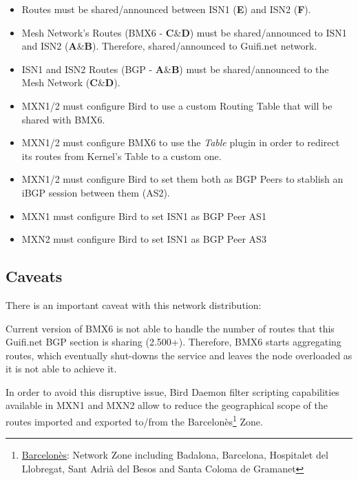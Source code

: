 \begin{itemize}
    \item Routes must be shared/announced between ISN1 (\textbf{E}) and ISN2 (\textbf{F}).
    \item Mesh Network's Routes (BMX6 - \textbf{C}\&\textbf{D}) must be shared/announced to ISN1 and ISN2 (\textbf{A}\&\textbf{B}). Therefore, shared/announced to Guifi.net network.
    \item ISN1 and ISN2 Routes (BGP - \textbf{A}\&\textbf{B}) must be shared/announced to the Mesh Network (\textbf{C}\&\textbf{D}).
    \item MXN1/2 must configure Bird to use a custom Routing Table that will be shared with BMX6.
    \item MXN1/2 must configure BMX6 to use the \textit{Table} plugin in order to redirect its routes from Kernel's Table to a custom one.
    \item MXN1/2 must configure Bird to set them both as BGP Peers to stablish an iBGP session between them (AS2).
    \item MXN1 must configure Bird to set ISN1 as BGP Peer AS1
    \item MXN2 must configure Bird to set ISN1 as BGP Peer AS3
\end{itemize}

\subsection{Caveats}
There is an important caveat with this network distribution:

Current version of BMX6 is not able to handle the number of routes that this Guifi.net BGP section is sharing (2.500+). Therefore, BMX6 starts aggregating routes, which eventually shut-downs the service and leaves the node overloaded as it is not able to achieve it.

In order to avoid this disruptive issue, Bird Daemon filter scripting capabilities available in MXN1 and MXN2 allow to reduce the geographical scope of the routes imported and exported to/from the Barcelon\`{e}s\footnote{\href{https://guifi.net/en/barcelones}{Barcelon\`{e}s}: Network Zone including Badalona, Barcelona, Hospitalet del Llobregat, Sant Adri\`{a} del Besos and Santa Coloma de Gramanet} Zone.

